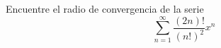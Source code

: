 \item Encuentre el radio de convergencia de la serie
    \[ \sum_{n=1}^\infty \frac{(2n)!}{(n!)^2} x^n \]
